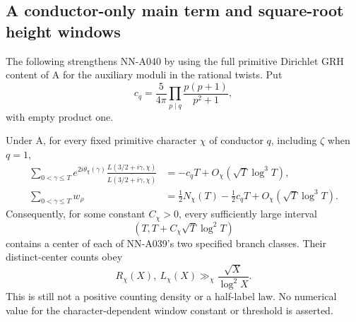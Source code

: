 \subsection{A conductor-only main term and square-root height windows}
\label{sec:A040-rational-refinement}

The following strengthens NN-A040 by using the full primitive
Dirichlet GRH content of A for the auxiliary moduli in the rational
twists. Put
\begin{equation}\label{eq:A040-cq}
 c_q=\frac5{4\pi}\prod_{p\mid q}\frac{p(p+1)}{p^2+1},
\end{equation}
with empty product one.

\begin{theorem}
\label{thm:A040-square-root}
Under A, for every fixed primitive character $\chi$ of conductor
$q$, including $\zeta$ when $q=1$,
\begin{align}\label{eq:A040-exact-mixed}
 \sum_{0<\gamma\le T}e^{2i\theta_\chi(\gamma)}
   \frac{L(3/2+i\gamma,\chi)}
        {\overline{L(3/2+i\gamma,\chi)}}
     &=-c_qT+O_\chi(\sqrt T\log^3T),\\
 \sum_{0<\gamma\le T}w_\rho
     &=\tfrac12N_\chi(T)-\tfrac12c_qT
                       +O_\chi(\sqrt T\log^3T).\nonumber
\end{align}
Consequently, for some constant $C_\chi>0$, every sufficiently
large interval
\begin{equation}\label{eq:A040-square-root-window}
                    (T,T+C_\chi\sqrt T\log^2T)
\end{equation}
contains a center of each of NN-A039's two specified branch
classes. Their distinct-center counts obey
\begin{equation}\label{eq:A040-square-root-counts}
 R_\chi(X),\ L_\chi(X)\gg_\chi\frac{\sqrt X}{\log^2X}.
\end{equation}
This is still not a positive counting density or a half-label law.
No numerical value for the character-dependent window constant
or threshold is asserted.
\end{theorem}

